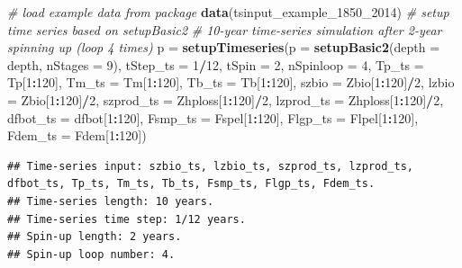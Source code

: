 \documentclass[
]{article}
\newenvironment{Shaded}{\begin{snugshade}}{\end{snugshade}}
\newcommand{\AttributeTok}[1]{\textcolor[rgb]{0.13,0.29,0.53}{#1}}
\newcommand{\CommentTok}[1]{\textcolor[rgb]{0.56,0.35,0.01}{\textit{#1}}}
\newcommand{\DecValTok}[1]{\textcolor[rgb]{0.00,0.00,0.81}{#1}}
\newcommand{\FunctionTok}[1]{\textcolor[rgb]{0.13,0.29,0.53}{\textbf{#1}}}
\newcommand{\NormalTok}[1]{#1}
\newcommand{\OtherTok}[1]{\textcolor[rgb]{0.56,0.35,0.01}{#1}}
\newcommand{\SpecialCharTok}[1]{\textcolor[rgb]{0.81,0.36,0.00}{\textbf{#1}}}
\begin{document}
\begin{Shaded}
\begin{Highlighting}[]
\CommentTok{\# load example data from package }
\FunctionTok{data}\NormalTok{(tsinput\_example\_1850\_2014)}
\CommentTok{\# setup time series based on setupBasic2}
\CommentTok{\# 10{-}year time{-}series simulation after 2{-}year spinning up (loop 4 times) }
\NormalTok{p }\OtherTok{=} \FunctionTok{setupTimeseries}\NormalTok{(}\AttributeTok{p =} \FunctionTok{setupBasic2}\NormalTok{(}\AttributeTok{depth =}\NormalTok{ depth, }\AttributeTok{nStages =} \DecValTok{9}\NormalTok{),}
                    \AttributeTok{tStep\_ts =} \DecValTok{1}\SpecialCharTok{/}\DecValTok{12}\NormalTok{,}
                    \AttributeTok{tSpin =} \DecValTok{2}\NormalTok{,}
                    \AttributeTok{nSpinloop =} \DecValTok{4}\NormalTok{, }
                    \AttributeTok{Tp\_ts =}\NormalTok{ Tp[}\DecValTok{1}\SpecialCharTok{:}\DecValTok{120}\NormalTok{],}
                    \AttributeTok{Tm\_ts =}\NormalTok{ Tm[}\DecValTok{1}\SpecialCharTok{:}\DecValTok{120}\NormalTok{],}
                    \AttributeTok{Tb\_ts =}\NormalTok{ Tb[}\DecValTok{1}\SpecialCharTok{:}\DecValTok{120}\NormalTok{],}
                    \AttributeTok{szbio =}\NormalTok{ Zbio[}\DecValTok{1}\SpecialCharTok{:}\DecValTok{120}\NormalTok{]}\SpecialCharTok{/}\DecValTok{2}\NormalTok{,}
                    \AttributeTok{lzbio =}\NormalTok{ Zbio[}\DecValTok{1}\SpecialCharTok{:}\DecValTok{120}\NormalTok{]}\SpecialCharTok{/}\DecValTok{2}\NormalTok{,}
                    \AttributeTok{szprod\_ts =}\NormalTok{ Zhploss[}\DecValTok{1}\SpecialCharTok{:}\DecValTok{120}\NormalTok{]}\SpecialCharTok{/}\DecValTok{2}\NormalTok{,}
                    \AttributeTok{lzprod\_ts =}\NormalTok{ Zhploss[}\DecValTok{1}\SpecialCharTok{:}\DecValTok{120}\NormalTok{]}\SpecialCharTok{/}\DecValTok{2}\NormalTok{,}
                    \AttributeTok{dfbot\_ts  =}\NormalTok{ dfbot[}\DecValTok{1}\SpecialCharTok{:}\DecValTok{120}\NormalTok{],}
                    \AttributeTok{Fsmp\_ts   =}\NormalTok{ Fspel[}\DecValTok{1}\SpecialCharTok{:}\DecValTok{120}\NormalTok{],}
                    \AttributeTok{Flgp\_ts   =}\NormalTok{ Flpel[}\DecValTok{1}\SpecialCharTok{:}\DecValTok{120}\NormalTok{],}
                    \AttributeTok{Fdem\_ts   =}\NormalTok{ Fdem[}\DecValTok{1}\SpecialCharTok{:}\DecValTok{120}\NormalTok{])}
\end{Highlighting}
\end{Shaded}

\begin{verbatim}
## Time-series input: szbio_ts, lzbio_ts, szprod_ts, lzprod_ts, dfbot_ts, Tp_ts, Tm_ts, Tb_ts, Fsmp_ts, Flgp_ts, Fdem_ts. 
## Time-series length: 10 years. 
## Time-series time step: 1/12 years. 
## Spin-up length: 2 years. 
## Spin-up loop number: 4.
\end{verbatim}
\end{document}
